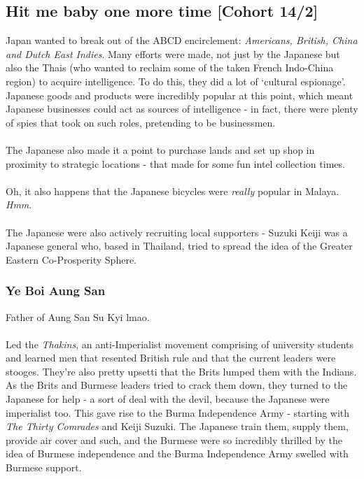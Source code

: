 \documentclass[a4paper]{article}
\begin{document}
\subsection{Hit me baby one more time [Cohort 14/2]}
Japan wanted to break out of the ABCD encirclement: \textit{Americans, British, China and Dutch East Indies}. Many efforts were made, not just by the Japanese but also the Thais (who wanted to reclaim some of the taken French Indo-China region) to acquire intelligence. To do this, they did a lot of `cultural espionage'. Japanese goods and products were incredibly popular at this point, which meant Japanese businesses could act as sources of intelligence - in fact, there were plenty of spies that took on such roles, pretending to be businessmen.\\ 
\\
The Japanese also made it a point to purchase lands and set up shop in proximity to strategic locations - that made for some fun intel collection times.\\
\\
Oh, it also happens that the Japanese bicycles were \textit{really} popular in Malaya. \textit{Hmm}.\\
\\
The Japanese were also actively recruiting local supporters - Suzuki Keiji was a Japanese general who, based in Thailand, tried to spread the idea of the Greater Eastern Co-Prosperity Sphere.
\subsubsection{Ye Boi Aung San}
Father of Aung San Su Kyi lmao.\\
\\
Led the \textit{Thakins}, an anti-Imperialist movement comprising of university students and learned men that resented British rule and that the current leaders were stooges. They're also pretty upsetti that the Brits lumped them with the Indians. As the Brits and Burmese leaders tried to crack them down, they turned to the Japanese for help - a sort of deal with the devil, because the Japanese were imperialist too.  This gave rise to the Burma Independence Army - starting with \textit{The Thirty Comrades} and Keiji Suzuki. The Japanese train them, supply them, provide air cover and such, and the Burmese were so incredibly thrilled by the idea of Burmese independence and the Burma Independence Army swelled with Burmese support.
\end{document}
